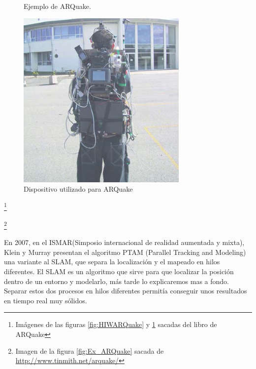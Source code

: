 \begin{figure}[ht]
\begin{minipage}{0.32\textwidth}
    \caption{Ejemplo de ARQuake.}
    \label{fig:Ex_ARQuake}
    \end{minipage}
        \begin{minipage}{0.32\textwidth}
        \centering
        \includegraphics[width=\linewidth]{Images/ARQuake_Dispositivo.png}
    \caption{Dispositivo utilizado para ARQuake}
    \label{fig:Dispositivo_ARQuake}
    \end{minipage}
\end{figure}


{\let\thefootnote\relax\footnote{{{Imágenes de las figuras \ref{fig:HIWARQuake} y \ref{fig:Dispositivo_ARQuake} sacadas del libro de ARQuake\cite{ARQuake}  }}}}

{\let\thefootnote\relax\footnote{{Imagen de la figura \ref{fig:Ex_ARQuake} sacada de \url{http://www.tinmith.net/arquake/}}}}

En 2007, en el ISMAR(Simposio internacional de realidad aumentada y mixta), Klein y Murray presentan el algoritmo PTAM (Parallel Tracking and Modeling) una variante al SLAM, que separa la localización y el mapeado en hilos diferentes. El SLAM es un algoritmo que sirve para que localizar la posición dentro de un entorno y modelarlo, más tarde lo explicaremos mas a fondo. Separar estos dos procesos en hilos diferentes permitía conseguir unos resultados en tiempo real muy sólidos.\\

